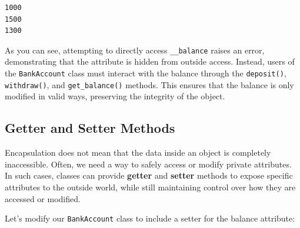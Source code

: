 \documentclass[
  letterpaper,
  DIV=11,
  numbers=noendperiod]{scrreprt}
\begin{document}
\begin{verbatim}
1000
1500
1300
\end{verbatim}

As you can see, attempting to directly access \texttt{\_\_balance}
raises an error, demonstrating that the attribute is hidden from outside
access. Instead, users of the \texttt{BankAccount} class must interact
with the balance through the \texttt{deposit()}, \texttt{withdraw()},
and \texttt{get\_balance()} methods. This ensures that the balance is
only modified in valid ways, preserving the integrity of the object.

\hypertarget{getter-and-setter-methods}{%
\subsection{Getter and Setter Methods}\label{getter-and-setter-methods}}

Encapsulation does not mean that the data inside an object is completely
inaccessible. Often, we need a way to safely access or modify private
attributes. In such cases, classes can provide \textbf{getter} and
\textbf{setter} methods to expose specific attributes to the outside
world, while still maintaining control over how they are accessed or
modified.

Let's modify our \texttt{BankAccount} class to include a setter for the
balance attribute:
\end{document}
